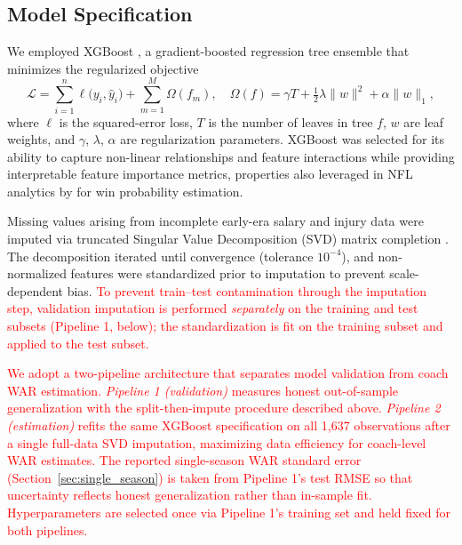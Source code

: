 \documentclass[USenglish]{article}
\newcommand{\rev}[1]{\textcolor{red}{#1}}
\theoremstyle{dgthm}
\theoremstyle{dgdef}
\begin{document}
\subsection{Model Specification}

We employed XGBoost \citep{chen2016}, a gradient-boosted regression tree ensemble that minimizes the regularized objective
\begin{equation}
\mathcal{L} = \sum_{i=1}^{n} \ell\!\bigl(y_i, \hat{y}_i\bigr) + \sum_{m=1}^{M} \Omega(f_m), \quad \Omega(f) = \gamma T + \tfrac{1}{2}\lambda \|w\|^2 + \alpha \|w\|_1,
\label{eq:xgboost}
\end{equation}
where $\ell$ is the squared-error loss, $T$ is the number of leaves in tree $f$, $w$ are leaf weights, and $\gamma$, $\lambda$, $\alpha$ are regularization parameters. XGBoost was selected for its ability to capture non-linear relationships and feature interactions while providing interpretable feature importance metrics, properties also leveraged in NFL analytics by \citet{lock2014} for win probability estimation.

Missing values arising from incomplete early-era salary and injury data were imputed via truncated Singular Value Decomposition (SVD) matrix completion \citep{brand2002}. The decomposition iterated until convergence (tolerance $10^{-4}$), and non-normalized features were standardized prior to imputation to prevent scale-dependent bias. \rev{To prevent train--test contamination through the imputation step, validation imputation is performed \emph{separately} on the training and test subsets (Pipeline 1, below); the standardization is fit on the training subset and applied to the test subset.}

\rev{We adopt a two-pipeline architecture that separates model validation from coach WAR estimation. \emph{Pipeline 1 (validation)} measures honest out-of-sample generalization with the split-then-impute procedure described above. \emph{Pipeline 2 (estimation)} refits the same XGBoost specification on all 1,637 observations after a single full-data SVD imputation, maximizing data efficiency for coach-level WAR estimates. The reported single-season WAR standard error (Section~\ref{sec:single_season}) is taken from Pipeline 1's test RMSE so that uncertainty reflects honest generalization rather than in-sample fit. Hyperparameters are selected once via Pipeline 1's training set and held fixed for both pipelines.}
\end{document}
